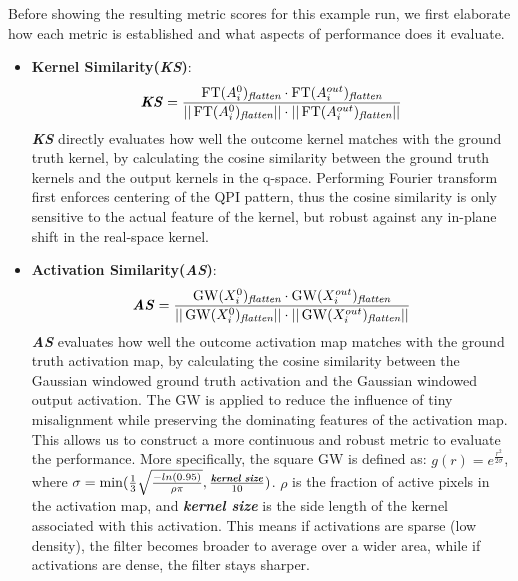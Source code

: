 Before showing the resulting metric scores for this example run, we first elaborate how each metric is established and what aspects of performance does it evaluate. 
\begin{itemize}
	\item \textbf{Kernel Similarity(\textit{KS})}: 
	\begin{equation}
		\textbf{\textit{KS}} = \frac{\operatorname{FT}(A_i^0)_{\textit{flatten}} \cdot  \operatorname{FT}(A_i^{out})_{\textit{flatten}}}{\vert \vert \operatorname{FT}(A_i^0)_{\textit{flatten}} \vert \vert \cdot  \vert \vert \operatorname{FT}(A_i^{out})_{\textit{flatten}}\vert \vert}
	\end{equation}
	\textbf{\textit{KS}} directly evaluates how well the outcome kernel matches with the ground truth kernel, by calculating the cosine similarity between the ground truth kernels and the output kernels in the q-space. Performing Fourier transform first enforces centering of the \ac{QPI} pattern, thus the cosine similarity is only sensitive to the actual feature of the kernel, but robust against any in-plane shift in the real-space kernel. 
	
	\item \textbf{Activation Similarity(\textit{AS})}: 
	\begin{equation}
		\textbf{\textit{AS}} = \frac{\operatorname{GW}(X_i^0)_{\textit{flatten}} \cdot  \operatorname{GW}(X_i^{out})_{\textit{flatten}}}{\vert \vert \operatorname{GW}(X_i^0)_{\textit{flatten}} \vert \vert \cdot  \vert \vert \operatorname{GW}(X_i^{out})_{\textit{flatten}}\vert \vert}
	\end{equation}
	\textbf{\textit{AS}} evaluates how well the outcome activation map matches with the ground truth activation map, by calculating the cosine similarity between the Gaussian windowed ground truth activation and the Gaussian windowed output activation. The GW is applied to reduce the influence of tiny misalignment while preserving the dominating features of the activation map. This allows us to construct a more continuous and robust metric to evaluate the performance. More specifically, the square GW is defined as: $g(r)= e^{\frac{r^2}{2 \sigma}}$, where $\sigma = \operatorname{min}(\frac{1}{3}\sqrt{\frac{-ln(0.95)}{\rho \pi}}, \frac{\textbf{\textit{kernel size}}}{10})$. $\rho$ is the fraction of active pixels in the activation map, and \textbf{\textit{kernel size}} is the side length of the kernel associated with this activation. This means if activations are sparse (low density), the filter becomes broader to average over a wider area, while if activations are dense, the filter stays sharper.
	

\end{itemize}
